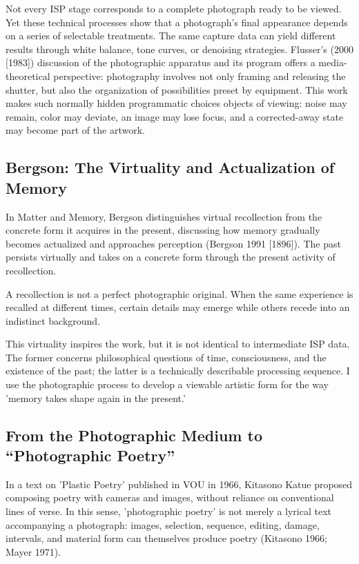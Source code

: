 \documentclass[manuscript,review,anonymous,authoryear]{acmart}
\begin{document}
Not every ISP stage corresponds to a complete photograph ready to be viewed. Yet these technical processes show that a photograph's final appearance depends on a series of selectable treatments. The same capture data can yield different results through white balance, tone curves, or denoising strategies. Flusser's (2000 [1983]) discussion of the photographic apparatus and its program offers a media-theoretical perspective: photography involves not only framing and releasing the shutter, but also the organization of possibilities preset by equipment. This work makes such normally hidden programmatic choices objects of viewing: noise may remain, color may deviate, an image may lose focus, and a corrected-away state may become part of the artwork.


\subsection{Bergson: The Virtuality and Actualization of Memory}

In Matter and Memory, Bergson distinguishes virtual recollection from the concrete form it acquires in the present, discussing how memory gradually becomes actualized and approaches perception (Bergson 1991 [1896]). The past persists virtually and takes on a concrete form through the present activity of recollection.


A recollection is not a perfect photographic original. When the same experience is recalled at different times, certain details may emerge while others recede into an indistinct background.


This virtuality inspires the work, but it is not identical to intermediate ISP data. The former concerns philosophical questions of time, consciousness, and the existence of the past; the latter is a technically describable processing sequence. I use the photographic process to develop a viewable artistic form for the way 'memory takes shape again in the present.'


\subsection{From the Photographic Medium to ``Photographic Poetry''}

In a text on 'Plastic Poetry' published in VOU in 1966, Kitasono Katue proposed composing poetry with cameras and images, without reliance on conventional lines of verse. In this sense, 'photographic poetry' is not merely a lyrical text accompanying a photograph: images, selection, sequence, editing, damage, intervals, and material form can themselves produce poetry (Kitasono 1966; Mayer 1971).
\end{document}
